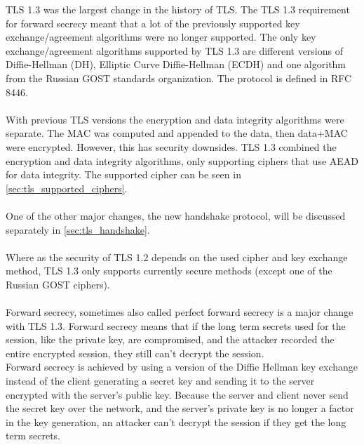 TLS 1.3 was the largest change in the history of TLS. The TLS 1.3 requirement for forward secrecy meant that a lot of the previously supported key exchange/agreement algorithms were no longer supported. The only key exchange/agreement algorithms supported by TLS 1.3 are different versions of Diffie-Hellman (DH), Elliptic Curve Diffie-Hellman (ECDH) and one algorithm from the Russian GOST standards organization. The protocol is defined in RFC 8446.
\\\\
With previous TLS versions the encryption and data integrity algorithms were separate. The MAC was computed and appended to the data, then data+MAC were encrypted. However, this has security downsides. TLS 1.3 combined the encryption and data integrity algorithms, only supporting ciphers that use AEAD for data integrity. The supported cipher can be seen in \ref{sec:tls_supported_ciphers}.
\\\\
One of the other major changes, the new handshake protocol, will be discussed separately in \ref{sec:tls_handshake}.
\\\\
Where as the security of TLS 1.2 depends on the used cipher and key exchange method, TLS 1.3 only supports currently secure methods (except one of the Russian GOST ciphers).
\\\\
Forward secrecy, sometimes also called perfect forward secrecy is a major change with TLS 1.3. Forward secrecy means that if the long term secrets used for the session, like the private key, are compromised, and the attacker recorded the entire encrypted session, they still can't decrypt the session.
\\
Forward secrecy is achieved by using a version of the Diffie Hellman key exchange instead of the client generating a secret key and sending it to the server encrypted with the server's public key. Because the server and client never send the secret key over the network, and the server's private key is no longer a factor in the key generation, an attacker can't decrypt the session if they get the long term secrets.
